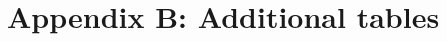 \chapter{Appendix B: Additional tables} %

\label{AppendixB} %

\begin{comment}
\section{TestType Structure for STAR Hybrid Assembly}
\label{sec:teststructure}


\begin{table}[H]
    \centering
    \begin{tabular}{|c|c|c|c|c|}
        \hline
        Name                   & Description & dataType & valueType & Required \\ \hline
        enc\_est\_away         & -           & array    & float     & True     \\ \hline
        enc\_est\_under        & -           & array    & float     & True     \\ \hline
        occupancy\_mean\_away  & -           & array    & float     & True     \\ \hline
        occupancy\_mean\_under & -           & array    & float     & True     \\ \hline
        occupancy\_rms\_away   & -           & array    & float     & True     \\ \hline
        occupancy\_rms\_under  & -           & array    & float     & True     \\ \hline
        offset\_away           & -           & array    & float     & True     \\ \hline
        offset\_under          & -           & array    & float     & True     \\ \hline
    \end{tabular}
    \caption{Table of parameters of the Noise Occupancy test (NO\_PPA)}
\end{table}


\begin{table}[H]
    \centering
    \begin{tabular}{|c|c|c|c|c|}
        \hline 
        Name        & Description & dataType & valueType & Required \\ \hline \hline
        trim\_away  & -           & array    & float     & True     \\ \hline
        trim\_under & -           & array    & float     & True     \\ \hline
    \end{tabular}
    \caption{Table of parameters of the Pedestal Trim test (PEDESTAL\_TRIM\_PPA)}
\end{table}



\end{comment}
